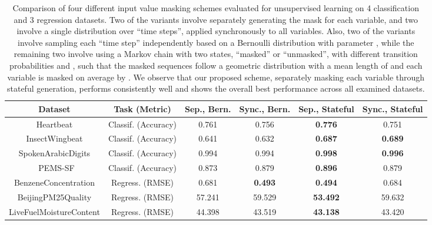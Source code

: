 \documentclass{article} \usepackage{iclr2021_conference,times}
\begin{document}
\begin{table}
\centering
\begin{adjustbox}{width=1.2\textwidth,center=\textwidth}

\begin{tabular}{|c|c|c|c|c|c|} 
\hline
\textbf{Dataset}        & \textbf{Task (Metric)} & \textbf{Sep., Bern.} & \textbf{\textbf{Sync., Bern.}}  & \textbf{Sep., Stateful} & \textbf{Sync., Stateful}  \\ 
\hline
Heartbeat               & Classif. (Accuracy)    & 0.761                & 0.756                           & \textbf{0.776}          & 0.751                     \\
InsectWingbeat          & Classif. (Accuracy)    & 0.641                & 0.632                           & \textbf{0.687}          & \textbf{0.689}            \\
SpokenArabicDigits      & Classif. (Accuracy)    & 0.994                & 0.994                           & \textbf{0.998}          & \textbf{0.996}            \\
~PEMS-SF                & Classif. (Accuracy)    & 0.873                  & 0.879                             & \textbf{0.896}                     & 0.879                       \\ 
\hhline{|======|}
BenzeneConcentration    & Regress. (RMSE)        & 0.681                & \textbf{0.493}                  & \textbf{0.494}          & 0.684                     \\
BeijingPM25Quality      & Regress. (RMSE)        & 57.241               & 59.529                          & \textbf{53.492}         & 59.632                    \\
LiveFuelMoistureContent & Regress. (RMSE)        & 44.398               & 43.519                          & \textbf{43.138}         & 43.420                    \\
\hline
\end{tabular}
\end{adjustbox}
\caption{Comparison of four different input value masking schemes evaluated for unsupervised learning on 4 classification and 3 regression datasets. Two of the variants involve separately generating the mask for each variable, and two involve a single distribution over ``time steps'', applied synchronously to all variables. Also, two of the variants involve sampling each ``time step'' independently based on a Bernoulli distribution with parameter , while the remaining two involve using a Markov chain with two states, ``masked'' or ``unmasked'', with different transition probabilities  and , such that the masked sequences follow a geometric distribution with a mean length of  and each variable is masked on average by . We observe that our proposed scheme, separately masking each variable through stateful generation, performs consistently well and shows the overall best performance across all examined datasets.}
\label{tab:masking_schemes}
\end{table}
\end{document}

